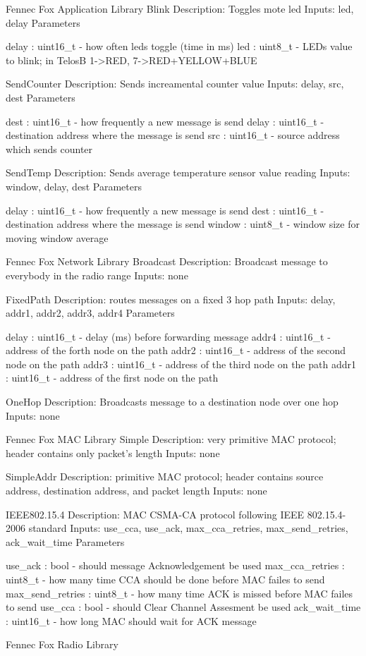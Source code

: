 


Fennec Fox Application Library
Blink
Description: Toggles mote led
Inputs: led, delay
Parameters

    delay : uint16_t - how often leds toggle (time in ms)
    led : uint8_t - LEDs value to blink; in TelosB 1->RED, 7->RED+YELLOW+BLUE 



SendCounter
Description: Sends increamental counter value
Inputs: delay, src, dest
Parameters

    dest : uint16_t - how frequently a new message is send
    delay : uint16_t - destination address where the message is send
    src : uint16_t - source address which sends counter 



SendTemp
Description: Sends average temperature sensor value reading
Inputs: window, delay, dest
Parameters

    delay : uint16_t - how frequently a new message is send
    dest : uint16_t - destination address where the message is send
    window : uint8_t - window size for moving window average 





Fennec Fox Network Library
Broadcast
Description: Broadcast message to everybody in the radio range
Inputs: none

FixedPath
Description: routes messages on a fixed 3 hop path
Inputs: delay, addr1, addr2, addr3, addr4
Parameters

    delay : uint16_t - delay (ms) before forwarding message
    addr4 : uint16_t - address of the forth node on the path
    addr2 : uint16_t - address of the second node on the path
    addr3 : uint16_t - address of the third node on the path
    addr1 : uint16_t - address of the first node on the path 



OneHop
Description: Broadcasts message to a destination node over one hop
Inputs: none






Fennec Fox MAC Library
Simple
Description: very primitive MAC protocol; header contains only packet's length
Inputs: none

SimpleAddr
Description: primitive MAC protocol; header contains source address, destination address, and packet length
Inputs: none

IEEE802.15.4
Description: MAC CSMA-CA protocol following IEEE 802.15.4-2006 standard
Inputs: use_cca, use_ack, max_cca_retries, max_send_retries, ack_wait_time
Parameters

    use_ack : bool - should message Acknowledgement be used
    max_cca_retries : uint8_t - how many time CCA should be done before MAC failes to send
    max_send_retries : uint8_t - how many time ACK is missed before MAC failes to send
    use_cca : bool - should Clear Channel Assesment be used
    ack_wait_time : uint16_t - how long MAC should wait for ACK message 






Fennec Fox Radio Library



